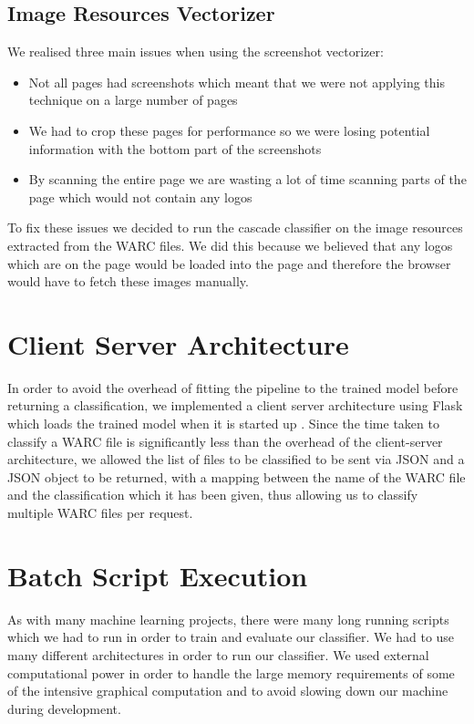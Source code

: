 \documentclass[12pt,twoside]{report}
\begin{document}
\subsection{Image Resources Vectorizer}\label{imageresourcesvectorizer}
We realised three main issues when using the screenshot vectorizer:
\begin{itemize}
    \item Not all pages had screenshots which meant that we were not applying this technique on a large number of pages
    \item We had to crop these pages for performance so we were losing potential information with the bottom part of the screenshots
    \item By scanning the entire page we are wasting a lot of time scanning parts of the page which would not contain any logos
\end{itemize}
To fix these issues we decided to run the cascade classifier on the image resources extracted from the WARC files. We did this because we believed that any logos which are on the page would be loaded into the page and therefore the browser would have to fetch these images manually.
\section{Client Server Architecture}
In order to avoid the overhead of fitting the pipeline to the trained model before returning a classification, we implemented a client server architecture using Flask which loads the trained model when it is started up \cite{flask}. Since the time taken to classify a WARC file is significantly less than the overhead of the client-server architecture, we allowed the list of files to be classified to be sent via JSON and a JSON object to be returned, with a mapping between the name of the WARC file and the classification which it has been given, thus allowing us to classify multiple WARC files per request.
\section{Batch Script Execution}
As with many machine learning projects, there were many long running scripts which we had to run in order to train and evaluate our classifier. We had to use many different architectures in order to run our classifier. We used external computational power in order to handle the large memory requirements of some of the intensive graphical computation and to avoid slowing down our machine during development.
\end{document}
